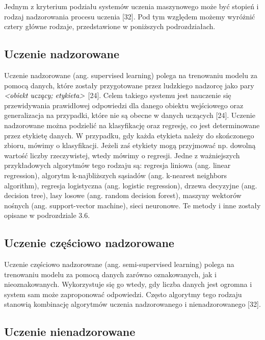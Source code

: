 Jednym z kryterium podziału systemów uczenia maszynowego może być stopień i rodzaj nadzorowania procesu uczenia [32]. Pod tym względem możemy wyróżnić cztery główne rodzaje, przedstawione w poniższych podrozdziałach.

\subsection{Uczenie nadzorowane}
\label{cha:cha3.2.1}

Uczenie nadzorowane (ang. supervised learning) polega na trenowaniu modelu za pomocą danych, które zostały przygotowane przez ludzkiego nadzorcę jako pary $\hbox{\it <obiekt~uczący; etykieta>}$ [24]. Celem takiego systemu jest nauczenie się przewidywania prawidłowej odpowiedzi dla danego obiektu wejściowego oraz generalizacja na przypadki, które nie są obecne w danych uczących [24]. 
Uczenie nadzorowane można podzielić na klasyfikację oraz regresję, co jest determinowane przez etykietę danych. W przypadku, gdy każda etykieta należy do skończonego zbioru, mówimy o klasyfikacji. Jeżeli zaś etykiety mogą przyjmować np. dowolną wartość liczby rzeczywistej, wtedy mówimy o regresji. Jedne z ważniejszych przykładowych algorytmów tego rodzaju są:
regresja liniowa (ang. linear regression),
algorytm k-najbliższych sąsiadów (ang. k-nearest neighbors algorithm),
regresja logistyczna (ang. logistic regression),
drzewa decyzyjne (ang. decision tree),
lasy losowe (ang. random decision forest),
maszyny wektorów nośnych (ang. support-vector machine),
sieci neuronowe.
Te metody i inne zostały opisane w podrozdziale 3.6. 

\subsection{Uczenie częściowo nadzorowane}
\label{cha:cha3.2.2}

Uczenie częściowo nadzorowane (ang. semi-supervised learning) polega na trenowaniu modelu za pomocą danych zarówno oznakowanych, jak i nieoznakowanych. Wykorzystuje się go wtedy, gdy liczba danych jest ogromna i system sam może zaproponować odpowiedzi. Często algorytmy tego rodzaju stanowią kombinację algorytmów uczenia nadzorowanego i nienadzorowanego [32].

\subsection{Uczenie nienadzorowane}
\label{cha:cha3.2.3}


